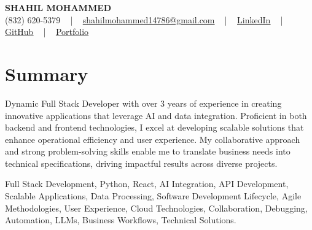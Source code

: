 \documentclass[letterpaper,10pt]{article}
\begin{document}
\begin{center}
    {\fontsize{14pt}{12pt}\selectfont \textbf{\MakeUppercase{Shahil Mohammed}}}\\ \vspace{2pt}
    \fontsize{10pt}{12pt}\selectfont (832) 620-5379 ~ | ~ \href{mailto:shahilmohammed14786@gmail.com}{shahilmohammed14786@gmail.com} ~ | ~  
    \href{https://www.linkedin.com/in/shahil-mohammed-9652931a1/}{\color{blue}\underline{LinkedIn}}  ~ | ~ 
    \href{https://github.com/freakbeast14}{\color{blue}\underline{GitHub}} ~ | ~ 
    \href{https://shahil-mohammed.netlify.app/}{\color{blue}\underline{Portfolio}}
    \vspace{-8pt}
\end{center}

\section{Summary}
\vspace{-2pt}\fontsize{8pt}{9pt}\selectfont
Dynamic Full Stack Developer with over 3 years of experience in creating innovative applications that leverage AI and data integration. Proficient in both backend and frontend technologies, I excel at developing scalable solutions that enhance operational efficiency and user experience. My collaborative approach and strong problem-solving skills enable me to translate business needs into technical specifications, driving impactful results across diverse projects. 

{\fontsize{1pt}{1pt}\selectfont\color{white}
Full Stack Development, Python, React, AI Integration, API Development, Scalable Applications, Data Processing, Software Development Lifecycle, Agile Methodologies, User Experience, Cloud Technologies, Collaboration, Debugging, Automation, LLMs, Business Workflows, Technical Solutions.
}
\vspace{-8pt}

\vspace{-2pt}
\end{document}
